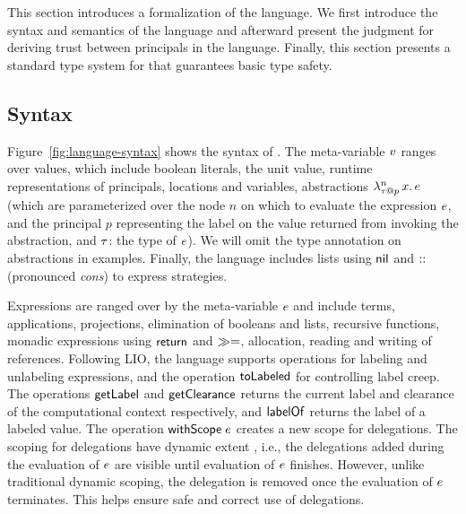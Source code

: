 This section introduces a formalization of the \lang{} language. We first introduce the syntax and semantics of the language and afterward present the judgment for deriving trust between principals in the language. Finally, this section presents a standard type system for \lang that guarantees basic type safety.

\subsection{Syntax}
Figure~\ref{fig:language-syntax} shows the syntax of \lang. The meta-variable $v$ ranges over values, which include boolean literals, the unit value, runtime representations of principals, locations and variables, abstractions $\lambda^{n}_{\tau \mathbin{@} p}\,x.\,e$ (which are parameterized over the node $n$ on which to evaluate the expression $e$, and the principal $p$ representing the label on the value returned from invoking the abstraction, and $\tau$: the type of $e$). We will omit the type annotation on abstractions in examples. Finally, the language includes lists using $\mathsf{nil}$ and $\mathbin{::}$ (pronounced \emph{cons}) to express strategies.

Expressions are ranged over by the meta-variable $e$ and include terms, applications, projections, elimination of booleans and lists, recursive functions, monadic expressions using $\mathsf{return}$ and $\gg=$, allocation, reading and writing of references. Following LIO, the language supports operations for labeling and unlabeling expressions, and the operation $\mathsf{toLabeled}$ for controlling label creep. The operations $\mathsf{getLabel}$ and $\mathsf{getClearance}$ returns the current label and clearance of the computational context respectively, and $\mathsf{labelOf}$ returns the label of a labeled value.
The operation $\mathsf{withScope}\;e$ creates a new scope for delegations. The scoping for delegations have dynamic extent \cite{Moore:2016:EAC:2983990.2984021}, i.e., the delegations added during the evaluation of $e$ are visible until evaluation of $e$ finishes. However, unlike traditional dynamic scoping, the delegation is removed once the evaluation of $e$ terminates. This helps ensure safe and correct use of delegations.

